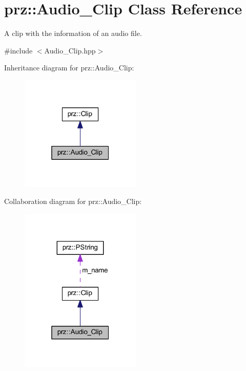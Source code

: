 \hypertarget{classprz_1_1_audio___clip}{}\section{prz\+::Audio\+\_\+\+Clip Class Reference}
\label{classprz_1_1_audio___clip}


A clip with the information of an audio file.  




{\ttfamily \#include $<$Audio\+\_\+\+Clip.\+hpp$>$}



Inheritance diagram for prz\+::Audio\+\_\+\+Clip\+:
\nopagebreak
\begin{figure}[H]
\begin{center}
\leavevmode
\includegraphics[width=163pt]{classprz_1_1_audio___clip__inherit__graph}
\end{center}
\end{figure}


Collaboration diagram for prz\+::Audio\+\_\+\+Clip\+:
\nopagebreak
\begin{figure}[H]
\begin{center}
\leavevmode
\includegraphics[width=163pt]{classprz_1_1_audio___clip__coll__graph}
\end{center}
\end{figure}
